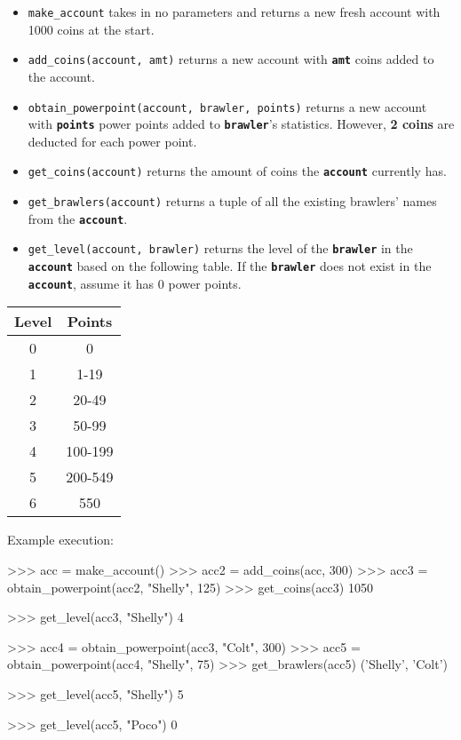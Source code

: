 \begin{itemize}
\item \colorbox{CornflowerBlue!20}{\texttt{make\_account}} takes in no parameters and returns a new fresh account with 1000 coins at the start.
\item \colorbox{CornflowerBlue!20}{\texttt{add\_coins(account, amt)}} returns a new account with \texttt{\bfseries amt} coins added to the account.
\item \colorbox{CornflowerBlue!20}{\texttt{obtain\_powerpoint(account, brawler, points)}} returns a new account with \texttt{\bfseries points} power 
points added to \texttt{\bfseries brawler}'s statistics. However, \textbf{2 coins} are deducted for each power point.
\item \colorbox{CornflowerBlue!20}{\texttt{get\_coins(account)}} returns the amount of coins the \texttt{\bfseries account} currently has.
\item \colorbox{CornflowerBlue!20}{\texttt{get\_brawlers(account)}} returns a tuple of all the existing brawlers' names from the \texttt{\bfseries account}.
\item \colorbox{CornflowerBlue!20}{\texttt{get\_level(account, brawler)}} returns the level of the \texttt{\bfseries brawler} in the 
\texttt{\bfseries account} based on the following table. If the \texttt{\bfseries brawler} does not exist in the \texttt{\bfseries account}, assume it has 
0 power points.
\end{itemize}

\begin{center}
\begin{tabular}{||c|c||} 
\hline
\textbf{Level} & \textbf{Points} \\ [0.5ex] 
\hline\hline
0 & 0 \\ 
\hline
1 & 1-19 \\ 
\hline
2 & 20-49 \\
\hline
3 & 50-99 \\
\hline
4 & 100-199 \\
\hline
5 & 200-549 \\
\hline
6 & 550 \\
\hline
\end{tabular}
\end{center}

Example execution:
\begin{python}
>>> acc = make_account()
>>> acc2 = add_coins(acc, 300)
>>> acc3 = obtain_powerpoint(acc2, "Shelly", 125)
>>> get_coins(acc3)
1050

>>> get_level(acc3, "Shelly")
4

>>> acc4 = obtain_powerpoint(acc3, "Colt", 300)
>>> acc5 = obtain_powerpoint(acc4, "Shelly", 75)
>>> get_brawlers(acc5)
('Shelly', 'Colt')

>>> get_level(acc5, "Shelly")
5

>>> get_level(acc5, "Poco")
0
\end{python}

